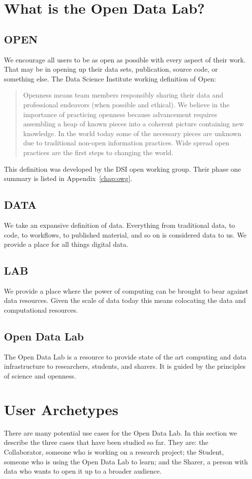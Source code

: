 \section{What is the Open Data Lab?}
\subsection*{OPEN}
We encourage all users to be as open as possible with every aspect of their work. That may be in opening up their data sets, publication, source code, or something else.
The Data Science Institute working definition of Open:
\begin{quote}
Openness means team members responsibly sharing their data and professional endeavors (when possible and ethical). We believe in the importance of practicing openness because advancement requires assembling a heap of known pieces into a coherent picture containing new knowledge. In the world today some of the necessary pieces are unknown due to traditional non-open information practices. Wide spread open practices are the first steps to changing the world.
\end{quote}

This definition was developed by the DSI open working group. Their phase one summary is listed in Appendix~\ref{chap:owg}.

\subsection*{DATA}
We take an expansive definition of data. Everything from traditional data, to code, to workflows, to published material, and so on is considered data to us. We provide a place for all things digital data.
\subsection*{LAB}
We provide a place where the power of computing can be brought to bear against data resources. Given the scale of data today this means colocating the data and computational resources.
\subsection*{Open Data Lab}
The Open Data Lab is a resource to provide state of the art computing and data infrastructure to researchers, students, and sharers. It is guided by the principles of science and openness.
 
\section{User Archetypes}
\label{sec:archetypes}
There are many potential use cases for the Open Data Lab. In this section we describe the three cases that have been studied so far. They are: the Collaborator, someone who is working on a research project; the Student, someone who is using the Open Data Lab to learn; and the Sharer, a person with data who wants to open it up to a broader audience.

